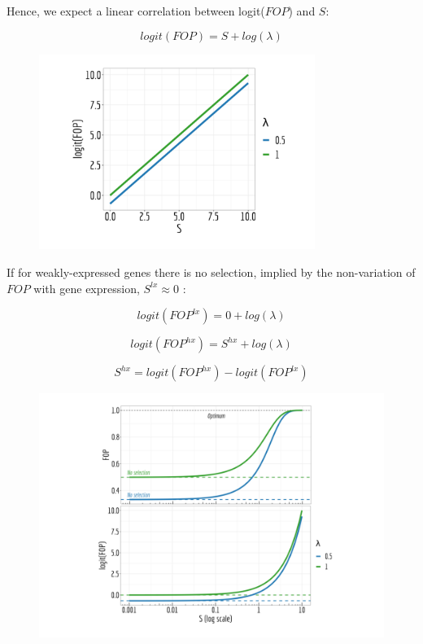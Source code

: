 Hence, we expect a linear correlation between logit($FOP$) and $S$:

\[ logit(FOP) = S + log(\lambda)
\]


\setcounter{figure}{0}
\begin{figure}[htbp]
    \centering                                                                            
    \includegraphics[width=0.8\textwidth]{Figure1_app.pdf}                                               
    \label{appfig:1}
\end{figure}

\newpage

If for weakly-expressed genes there is no selection, implied by the non-variation of $FOP$ with gene expression, $S^{lx}\approx0$ :

\[ logit(FOP^{lx}) = 0 + log(\lambda)
\]


\[ logit(FOP^{hx}) = S^{hx} + log(\lambda)
\]

\[ S^{hx}  = logit(FOP^{hx}) - logit(FOP^{lx})
\]

\begin{figure}[htbp]
    \centering                                                                            
    \includegraphics[width=\textwidth]{Figure2_app.pdf}                                               
    \label{appfig:2}
\end{figure}


